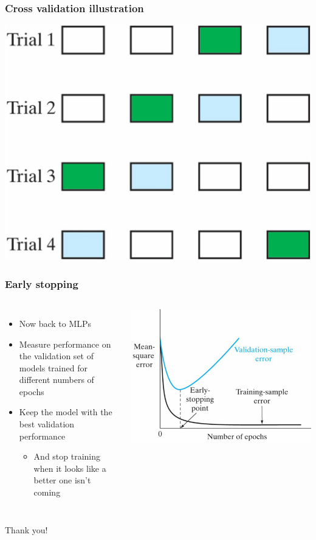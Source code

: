 \documentclass[12pt,notes,mathserif]{beamer}
\newcommand{\chuhao}{\fontsize{44.9pt}{\baselineskip}\selectfont}
\begin{document}
\begin{frame}[c]
\frametitle{Cross validation illustration}
\begin{center}
\includegraphics[width=0.61\linewidth]{fig/lec516.jpg}
\end{center}
\end{frame}

\begin{frame}[c]
\frametitle{Early stopping}
\begin{columns}
\begin{itemize}
\item Now back to MLPs
\item Measure performance on the validation set of models
trained for different numbers of epochs
\item Keep the model with the best validation performance
		\begin{itemize}
		\item And stop training when it looks like a better one isn't coming
		\end{itemize}
\end{itemize}

\begin{center}
\hspace*{-1.3cm}
\includegraphics[width=1.6\textwidth]{fig/lec517.jpg}
\end{center}
\end{columns}
\end{frame}









\begin{frame}
\begin{center}
\chuhao Thank you! %
\end{center}
\end{frame}
\end{document}
